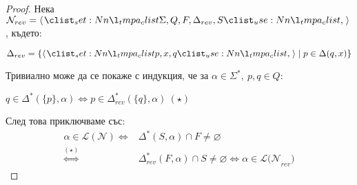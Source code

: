 \begin{proof}
    Нека $\mathcal{N}_{rev} = \opair{\Sigma, Q, F, \Delta_{rev}, S}$, където:
    \begin{center}
        $\Delta_{rev} = \{ \opair{p, x, q} \mid p \in \Delta(q, x) \}$
    \end{center}
    Тривиално може да се покаже с индукция, че за $\alpha \in \Sigma^*, \: p, q \in Q$:
    \begin{center}
        $q \in \Delta^*(\{ p \}, \alpha) \iff p \in \Delta_{rev}^*(\{ q \}, \alpha) \: (\star)$
    \end{center}
    След това приключваме със:
    \begin{align*}
        \alpha \in \mathcal{L(N)} \iff & \Delta^*(S, \alpha) \cap F \neq \varnothing                                            \\
        \stackrel{(\star)}{\iff}       & \Delta_{rev}^*(F, \alpha) \cap S \neq \varnothing \iff \alpha \in \mathcal{L(N}_{rev})
    \end{align*}
\end{proof}